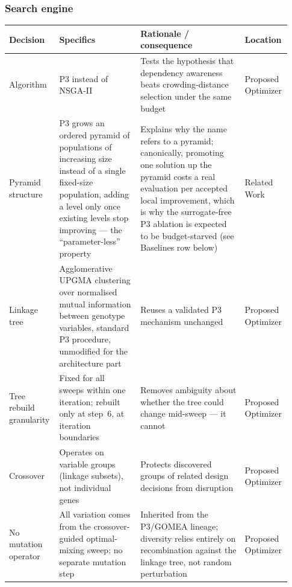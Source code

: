 \subsubsection*{Search engine}
\begin{longtable}{p{0.16\linewidth} p{0.28\linewidth} p{0.36\linewidth} p{0.13\linewidth}}
\toprule
\textbf{Decision} & \textbf{Specifics} & \textbf{Rationale / consequence} & \textbf{Location} \\
\midrule
\endhead
Algorithm & P3 instead of NSGA-II & Tests the hypothesis that dependency awareness beats crowding-distance selection under the same budget & Proposed Optimizer \\
Pyramid structure & P3 grows an ordered pyramid of populations of increasing size instead of a single fixed-size population, adding a level only once existing levels stop improving --- the ``parameter-less'' property & Explains why the name refers to a pyramid; canonically, promoting one solution up the pyramid costs a real evaluation per accepted local improvement, which is why the surrogate-free P3 ablation is expected to be budget-starved (see Baselines row below) & Related Work \\
Linkage tree & Agglomerative UPGMA clustering over normalised mutual information between genotype variables, standard P3 procedure, unmodified for the architecture part & Reuses a validated P3 mechanism unchanged & Proposed Optimizer \\
Tree rebuild granularity & Fixed for all sweeps within one iteration; rebuilt only at step~6, at iteration boundaries & Removes ambiguity about whether the tree could change mid-sweep --- it cannot & Proposed Optimizer \\
Crossover & Operates on variable groups (linkage subsets), not individual genes & Protects discovered groups of related design decisions from disruption & Proposed Optimizer \\
No mutation operator & All variation comes from the crossover-guided optimal-mixing sweep; no separate mutation step & Inherited from the P3/GOMEA lineage; diversity relies entirely on recombination against the linkage tree, not random perturbation & Proposed Optimizer \\
\bottomrule
\end{longtable}

